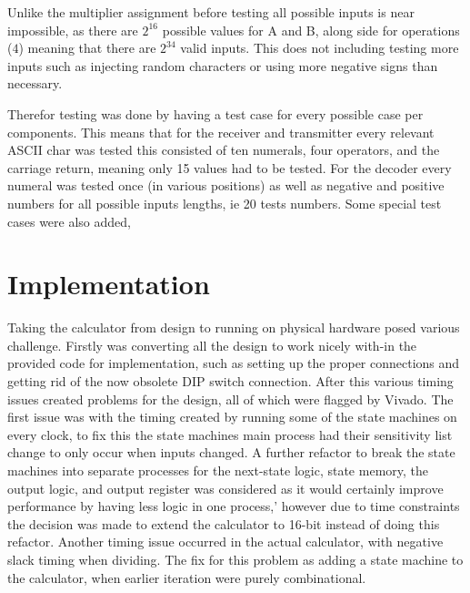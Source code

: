 \documentclass[11pt]{article}
\begin{document}
Unlike the multiplier assignment before testing all possible inputs is near impossible, as there are $2^{16}$ possible values for A and B, along side for operations ($4$) meaning that there are $2^{34}$ valid inputs.
This does not including testing more inputs such as injecting random characters or using more negative signs than necessary.

Therefor testing was done by having a test case for every possible case per components.
This means that for the receiver and transmitter every relevant ASCII char was tested this consisted of ten numerals, four operators, and the carriage return, meaning only 15 values had to be tested.
For the decoder every numeral was tested once (in various positions) as well as negative and positive numbers for all possible inputs lengths, ie 20 tests numbers. 
Some special test cases were also added,


\section{Implementation}

Taking the calculator from design to running on physical hardware posed various challenge.
Firstly was converting all the design to work nicely with-in the provided code for implementation, such as setting up the proper connections and getting rid of the now obsolete DIP switch connection.
After this various timing issues created problems for the design, all of which were flagged by Vivado. 
The first issue was with the timing created by running some of the state machines on every clock, to fix this the state machines main process had their sensitivity list change to only occur when inputs changed.
A further refactor to break the state machines into separate processes for the next-state logic, state memory, the output logic, and output register was considered as it would certainly improve performance by having less logic in one process,'
however due to time constraints the decision was made to extend the calculator to 16-bit instead of doing this refactor.
Another timing issue occurred in the actual calculator, with negative slack timing when dividing. 
The fix for this problem as adding a state machine to the calculator, when earlier iteration were purely combinational. 



\pagebreak
\printbibliography
\end{document}
